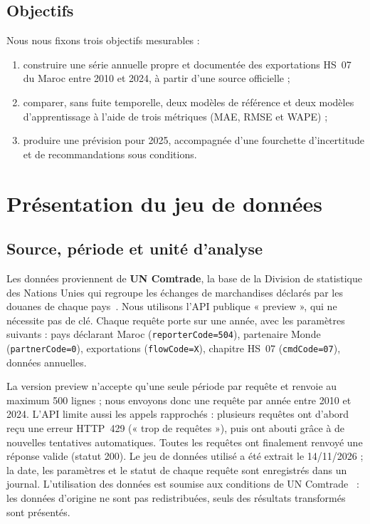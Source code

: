 \documentclass[11pt,a4paper]{article}
\begin{document}
\subsection{Objectifs}
Nous nous fixons trois objectifs mesurables :
\begin{enumerate}
\item construire une série annuelle propre et documentée des exportations HS~07 du Maroc entre 2010 et 2024, à partir d'une source officielle ;
\item comparer, sans fuite temporelle, deux modèles de référence et deux modèles d'apprentissage à l'aide de trois métriques (MAE, RMSE et WAPE) ;
\item produire une prévision pour 2025, accompagnée d'une fourchette d'incertitude et de recommandations sous conditions.
\end{enumerate}

\section{Présentation du jeu de données}\label{sec:data}

\subsection{Source, période et unité d'analyse}
Les données proviennent de \textbf{UN Comtrade}, la base de la Division de statistique des Nations Unies qui regroupe les échanges de marchandises déclarés par les douanes de chaque pays~\cite{comtrade}. Nous utilisons l'API publique « preview », qui ne nécessite pas de clé. Chaque requête porte sur une année, avec les paramètres suivants : pays déclarant Maroc (\texttt{reporterCode=504}), partenaire Monde (\texttt{partnerCode=0}), exportations (\texttt{flowCode=X}), chapitre HS~07 (\texttt{cmdCode=07}), données annuelles.

La version preview n'accepte qu'une seule période par requête et renvoie au maximum 500 lignes ; nous envoyons donc une requête par année entre 2010 et 2024. L'API limite aussi les appels rapprochés : plusieurs requêtes ont d'abord reçu une erreur HTTP~429 (« trop de requêtes »), puis ont abouti grâce à de nouvelles tentatives automatiques. Toutes les requêtes ont finalement renvoyé une réponse valide (statut 200). Le jeu de données utilisé a été extrait le 14/11/2026 ; la date, les paramètres et le statut de chaque requête sont enregistrés dans un journal. L'utilisation des données est soumise aux conditions de UN Comtrade~\cite{comtradelicence} : les données d'origine ne sont pas redistribuées, seuls des résultats transformés sont présentés.
\end{document}
